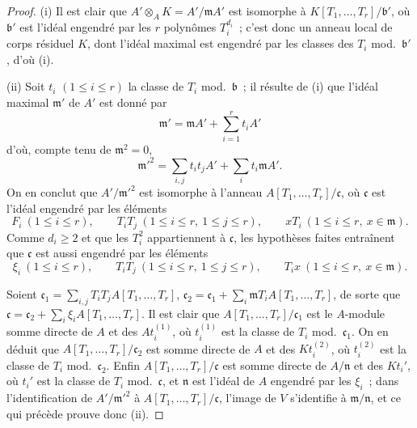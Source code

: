 \begin{proof}
(i) Il est clair que $A'\otimes_AK=A'/\mathfrak mA'$ est isomorphe à
$K[T_1,\ldots,T_r]/\mathfrak b'$, où $\mathfrak b'$ est l'idéal engendré
par les $r$ polynômes $T_i^{d_i}$~; c'est donc un anneau local de corps
résiduel $K$, dont l'idéal maximal est engendré par les classes des $T_i$
mod.~$\mathfrak b'$, d'où (i).

(ii) Soit $t_i$ $(1\leqslant i\leqslant r)$ la classe de $T_i$
mod.~$\mathfrak b$~; il résulte de (i) que l'idéal maximal $\mathfrak m'$ de
$A'$ est donné par
\[
  \mathfrak m'=\mathfrak mA'+\sum_{i=1}^r t_iA'
\]
d'où, compte tenu de $\mathfrak m^2=0$,
\[
  \mathfrak m'^2=\sum_{i,j}t_it_jA'+\sum_i t_i\mathfrak mA'.
\]
On en conclut que $A'/\mathfrak m'^2$ est isomorphe à l'anneau
$A[T_1,\ldots,T_r]/\mathfrak c$, où $\mathfrak c$ est l'idéal engendré par
les éléments
\[
  F_i\ (1\leqslant i\leqslant r),\qquad
  T_iT_j\ (1\leqslant i\leqslant r,\ 1\leqslant j\leqslant r),\qquad
  xT_i\ (1\leqslant i\leqslant r,\ x\in\mathfrak m).
\]
Comme $d_i\geqslant2$ et que les $T_i^2$ appartiennent à
$\mathfrak c$, les hypothèses faites entraînent que $\mathfrak c$ est aussi
engendré par les éléments
\[
  \xi_i\ (1\leqslant i\leqslant r),\qquad
  T_iT_j\ (1\leqslant i\leqslant r,\ 1\leqslant j\leqslant r),\qquad
  T_ix\ (1\leqslant i\leqslant r,\ x\in\mathfrak m).
\]

Soient
$\mathfrak c_1=\sum_{i,j}T_iT_jA[T_1,\ldots,T_r]$,
$\mathfrak c_2=\mathfrak c_1+\sum_i\mathfrak mT_iA[T_1,\ldots,T_r]$, de sorte que
$\mathfrak c=\mathfrak c_2+\sum_i\xi_iA[T_1,\ldots,T_r]$. Il est clair que
$A[T_1,\ldots,T_r]/\mathfrak c_1$ est le $A$-module somme directe de $A$ et
des $At_i^{(1)}$, où $t_i^{(1)}$ est la classe de $T_i$
mod.~$\mathfrak c_1$. On en déduit que
$A[T_1,\ldots,T_r]/\mathfrak c_2$ est somme directe de $A$ et des
$Kt_i^{(2)}$, où $t_i^{(2)}$ est la classe de $T_i$
mod.~$\mathfrak c_2$. Enfin $A[T_1,\ldots,T_r]/\mathfrak c$ est somme
directe de $A/\mathfrak n$ et des $Kt_i'$, où $t_i'$ est la classe de $T_i$
mod.~$\mathfrak c$, et $\mathfrak n$ est l'idéal de $A$ engendré par les
$\xi_i$~; dans l'identification de $A'/\mathfrak m'^2$ à
$A[T_1,\ldots,T_r]/\mathfrak c$, l'image de $V$ s'identifie à
$\mathfrak m/\mathfrak n$, et ce qui précède prouve donc (ii).
\end{proof}

